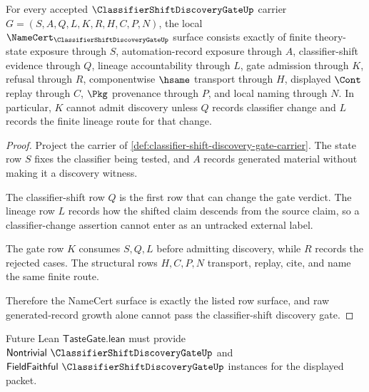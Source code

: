 \begin{theorem}
\label{thm:classifier-shift-discovery-gate-namecert-obligations}
For every accepted $\ClassifierShiftDiscoveryGateUp$ carrier $G=(S,A,Q,L,K,R,H,C,P,N)$, the local $\NameCert_{\ClassifierShiftDiscoveryGateUp}$ surface consists exactly of finite theory-state exposure through $S$, automation-record exposure through $A$, classifier-shift evidence through $Q$, lineage accountability through $L$, gate admission through $K$, refusal through $R$, componentwise $\hsame$ transport through $H$, displayed $\Cont$ replay through $C$, $\Pkg$ provenance through $P$, and local naming through $N$. In particular, $K$ cannot admit discovery unless $Q$ records classifier change and $L$ records the finite lineage route for that change.
\end{theorem}
\begin{proof}
Project the carrier of \autoref{def:classifier-shift-discovery-gate-carrier}. The state row $S$ fixes the classifier being tested, and $A$ records generated material without making it a discovery witness.

The classifier-shift row $Q$ is the first row that can change the gate verdict. The lineage row $L$ records how the shifted claim descends from the source claim, so a classifier-change assertion cannot enter as an untracked external label.

The gate row $K$ consumes $S,Q,L$ before admitting discovery, while $R$ records the rejected cases. The structural rows $H,C,P,N$ transport, replay, cite, and name the same finite route.

Therefore the NameCert surface is exactly the listed row surface, and raw generated-record growth alone cannot pass the classifier-shift discovery gate.
\end{proof}

Future Lean $\mathsf{TasteGate.lean}$ must provide $\mathsf{Nontrivial}\ \ClassifierShiftDiscoveryGateUp$ and $\mathsf{FieldFaithful}\ \ClassifierShiftDiscoveryGateUp$ instances for the displayed packet.



